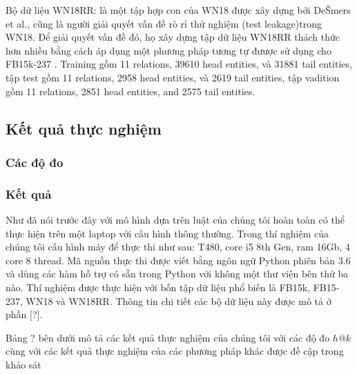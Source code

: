 Bộ dữ liệu WN18RR: là một tập hợp con của WN18 được xây dựng bởi DeŠmers et al.\cite{dettmers2017convolutional}, cũng là người giải quyết vấn đề rò rỉ thử nghiệm (test leakage)trong WN18. Để giải quyết vấn đề đó, họ xây dựng tập dữ liệu WN18RR thách thức hơn nhiều bằng cách áp dụng một phương pháp tương tự đưược sử dụng cho FB15k-237 \cite{toutanova2015observed}. Training gồm 11 relations, 39610 head entities, và 31881 tail entities, tập test gồm 11 relations, 2958 head entities, và 2619 tail entities, tập vadition gồm 11 relations, 2851 head entities, and 2575 tail entities.

\subsection{Kết quả thực nghiệm}
\subsubsection{Các độ đo}
\subsubsection{Kết quả}
Như đã nói trước đây với mô hình dựa trên luật của chúng tôi hoàn toàn có thể thực hiện trên một laptop với cấu hình thông thường. Trong thí nghiệm của chúng tôi cấu hình máy để thực thi như sau: T480, core i5 8th Gen, ram 16Gb, 4 core 8 thread. Mã nguồn thực thi được viết bằng ngôn ngữ Python phiên bản 3.6 và dùng các hàm hỗ trợ có sẵn trong Python với không một thư viện bên thứ ba nào. Thí nghiệm được thực hiện với bốn tập dữ liệu phổ biến là FB15k, FB15-237, WN18 và WN18RR. Thông tin chi tiết các bộ dữ liệu này được mô tả ở phần [?].

Bảng ? bên dưới mô tả các kết quả thực nghiệm của chúng tôi với các độ đo \(h@k\) cùng với các kết quả thực nghiệm của các phương pháp khác được đề cập trong khảo  sát \cite{rossi2020knowledge}

